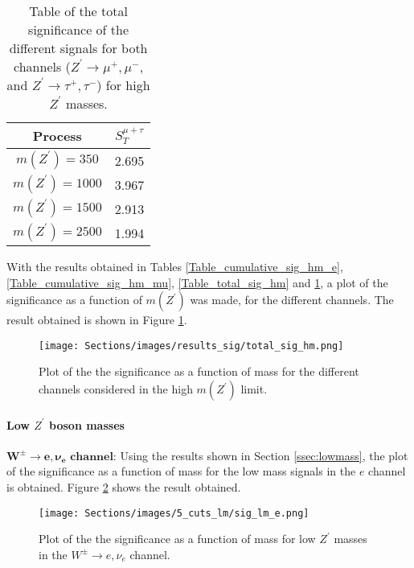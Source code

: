 \begin{table}[ht!]
\centering
\caption{Table of the total significance of the different signals for both channels ($Z^{\prime} \rightarrow \mu^+, \mu^-$, and $Z^{\prime} \rightarrow \tau^+, \tau^-$) for high $Z^{\prime}$ masses.}
\label{Table_total_cumulative_sig_hm}
\begin{tabular}{c|c}
\hline
\hline
Process & $S_T^{\mu + \tau}$ \\
\hline
$m(Z^{\prime}) = 350$ & 2.695 \\
$m(Z^{\prime}) = 1000$ & 3.967 \\
$m(Z^{\prime}) = 1500$ & 2.913 \\
$m(Z^{\prime}) = 2500$ & 1.994 \\
\hline
\hline
\end{tabular}
\end{table}

With the results obtained in Tables \ref{Table_cumulative_sig_hm_e}, \ref{Table_cumulative_sig_hm_mu}, \ref{Table_total_sig_hm} and \ref{Table_total_cumulative_sig_hm}, a plot of the significance as a function of $m(Z^{\prime})$ was made, for the different channels. The result obtained is shown in Figure \ref{result_sig_hm}.

\begin{figure}[ht!]
    \centering
    \texttt{[image: Sections/images/results\_sig/total\_sig\_hm.png]}
    \caption{Plot of the the significance as a function of mass for the different channels considered in the high $m(Z^{\prime})$ limit.}
    \label{result_sig_hm}
\end{figure}

\paragraph{Low $Z^{\prime}$ boson masses} \label{ssec:lowmasssig}

$\bm{W^{\pm} \rightarrow e, \nu_e} \textbf{ channel:}$ Using the results shown in Section \ref{ssec:lowmass}, the plot of the significance as a function of mass for the low mass signals in the $e$ channel is obtained. Figure \ref{Sig_lm_e} shows the result obtained.

\begin{figure}[ht!]
    \centering
    \texttt{[image: Sections/images/5\_cuts\_lm/sig\_lm\_e.png]}
    \caption{Plot of the the significance as a function of mass for low $Z^{\prime}$ masses in the $W^{\pm}\rightarrow e, \nu_e$ channel.}
    \label{Sig_lm_e}
\end{figure}


